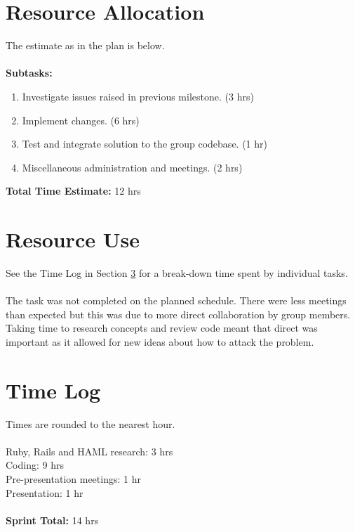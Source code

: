 \documentclass[10pt, a4]{article}
\begin{document}
\section{Resource Allocation}
The estimate as in the plan is below.\\
\\
\textbf{Subtasks:}
\begin{enumerate}
	\item Investigate issues raised in previous milestone. (3 hrs)
	\item Implement changes. (6 hrs)
	\item Test and integrate solution to the group codebase. (1 hr)
	\item Miscellaneous administration and meetings. (2 hrs)
\end{enumerate}
\textbf{Total Time Estimate:} 12 hrs

\section{Resource Use}
See the Time Log in Section \ref{time-log} for a break-down time spent by individual tasks.\\
\\
The task was not completed on the planned schedule. There were less meetings than expected but this was due to more direct collaboration by group members. Taking time to research concepts and review code meant that direct was important as it allowed for new ideas about how to attack the problem.

\section{Time Log}
\label{time-log}
Times are rounded to the nearest hour.\\
\\
Ruby, Rails and HAML research: 3 hrs\\
Coding: 9 hrs\\
Pre-presentation meetings: 1 hr\\
Presentation: 1 hr\\
\\
\textbf{Sprint Total:} 14 hrs%
\end{document}
